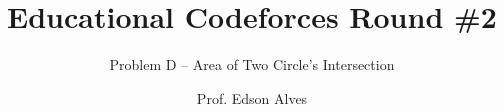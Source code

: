 \title{Educational Codeforces Round \#2}
\subtitle{Problem D -- Area of Two Circle's Intersection}
\date{}
\author{Prof. Edson Alves}
